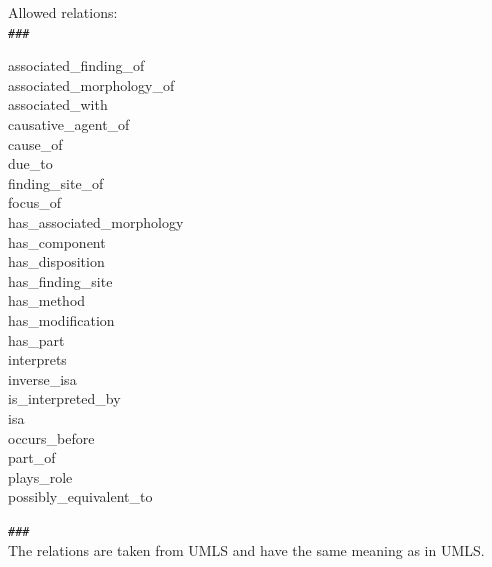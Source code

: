 \documentclass[10pt]{article}
\begin{document}
\begin{appendices}
\begin{tcolorbox}
Allowed relations:\\
\verb|###|
\begin{multicols}{3}
associated\_finding\_of \\
associated\_morphology\_of \\
associated\_with \\
causative\_agent\_of \\
cause\_of \\
due\_to \\
finding\_site\_of \\
focus\_of \\
has\_associated\_morphology \\
has\_component \\
has\_disposition \\
has\_finding\_site \\
has\_method \\
has\_modification \\
has\_part \\
interprets \\
inverse\_isa \\
is\_interpreted\_by \\
isa \\
occurs\_before \\
part\_of \\
plays\_role \\
possibly\_equivalent\_to
\end{multicols}

\verb|###|  \\

The relations are taken from UMLS and have the same meaning as in UMLS.  


\end{tcolorbox}
\end{appendices}
\end{document}
